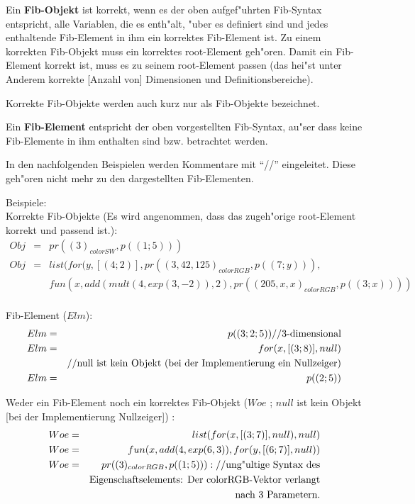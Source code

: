 Ein \textbf{Fib-Objekt} ist korrekt, wenn es der oben aufgef"uhrten Fib-Syntax entspricht, alle Variablen, die es enth"alt, "uber es definiert sind und jedes enthaltende Fib-Element in ihm ein korrektes Fib-Element ist. Zu einem korrekten Fib-Objekt muss ein korrektes root-Element geh"oren. Damit ein Fib-Element korrekt ist, muss es zu seinem root-Element passen (das hei"st unter Anderem korrekte [Anzahl von] Dimensionen und Definitionsbereiche).

Korrekte Fib-Objekte werden auch kurz nur als Fib-Objekte bezeichnet.

\bigskip\noindent
Ein \textbf{Fib-Element} entspricht der oben vorgestellten Fib-Syntax, au"ser dass keine Fib-Elemente in ihm enthalten sind bzw. betrachtet werden.

\bigskip\noindent
In den nachfolgenden Beispielen werden Kommentare mit ``//'' eingeleitet. Diese geh"oren nicht mehr zu den dargestellten Fib-Elementen.

\begin{flushleft}
Beispiele:\\
Korrekte Fib-Objekte (Es wird angenommen, dass das zugeh"orige root-Element korrekt und passend ist.):
\begin{eqnarray*}
Obj &=& pr( (3)_{colorSW}, p((1;5)))\\
Obj &=& list( for(y,[(4;2)], pr( (3, 42, 125)_{colorRGB} , p((7;y))), \\
&& fun(x,add( mult(4, exp( 3, -2)), 2 ), pr( (205, x ,x)_{colorRGB}, p((3;x)) ) )\\
\end{eqnarray*}

Fib-Element ($Elm$):
\begin{eqnarray*}
Elm &=& p((3;2;5)) \textnormal{//3-dimensional}\\
Elm &=& for(x,[(3;8)],null) \\
& & \textnormal{//null ist kein Objekt (bei der Implementierung ein Nullzeiger)}\\
Elm &=& p((2;5))\\
\end{eqnarray*}

Weder ein Fib-Element noch ein korrektes Fib-Objekt ($Woe$ ; $null$ ist kein Objekt [bei der Implementierung Nullzeiger]) :\\
\begin{eqnarray*}
Woe &=& list( for( x, [(3;7)], null), null)\\
Woe &=& fun( x, add(4, exp(6, 3) ) , for(y, [(6;7)], null))\\
Woe &=& pr( (3)_{colorRGB}, p((1;5)) ): \textnormal{//ung"ultige Syntax des} \\
&& \textnormal{Eigenschaftselements: Der colorRGB-Vektor verlangt}\\
&& \textnormal{nach 3 Parametern.}\\
\end{eqnarray*}

\end{flushleft}


